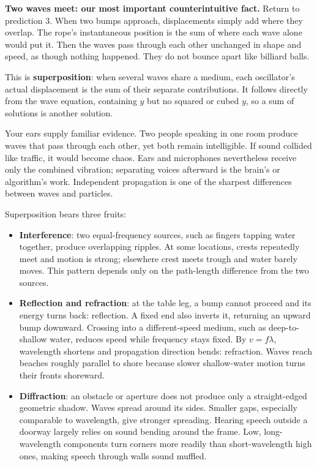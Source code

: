 \begin{mainline}
\textbf{Two waves meet: our most important counterintuitive fact.} Return to prediction 3. When two bumps approach, displacements simply add where they overlap. The rope's instantaneous position is the sum of where each wave alone would put it. Then the waves pass through each other unchanged in shape and speed, as though nothing happened. They do not bounce apart like billiard balls.

This is \textbf{superposition}: when several waves share a medium, each oscillator's actual displacement is the sum of their separate contributions. It follows directly from the wave equation, containing \(y\) but no squared or cubed \(y\), so a sum of solutions is another solution.

Your ears supply familiar evidence. Two people speaking in one room produce waves that pass through each other, yet both remain intelligible. If sound collided like traffic, it would become chaos. Ears and microphones nevertheless receive only the combined vibration; separating voices afterward is the brain's or algorithm's work. Independent propagation is one of the sharpest differences between waves and particles.

Superposition bears three fruits:

\begin{itemize}
  \item \textbf{Interference}: two equal-frequency sources, such as fingers tapping water together, produce overlapping ripples. At some locations, crests repeatedly meet and motion is strong; elsewhere crest meets trough and water barely moves. This pattern depends only on the path-length difference from the two sources.
  \item \textbf{Reflection and refraction}: at the table leg, a bump cannot proceed and its energy turns back: reflection. A fixed end also inverts it, returning an upward bump downward. Crossing into a different-speed medium, such as deep-to-shallow water, reduces speed while frequency stays fixed. By \(v=f\lambda\), wavelength shortens and propagation direction bends: refraction. Waves reach beaches roughly parallel to shore because slower shallow-water motion turns their fronts shoreward.
  \item \textbf{Diffraction}: an obstacle or aperture does not produce only a straight-edged geometric shadow. Waves spread around its sides. Smaller gaps, especially comparable to wavelength, give stronger spreading. Hearing speech outside a doorway largely relies on sound bending around the frame. Low, long-wavelength components turn corners more readily than short-wavelength high ones, making speech through walls sound muffled.
\end{itemize}
\end{mainline}

